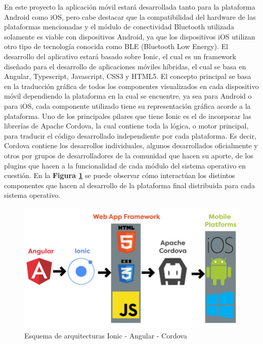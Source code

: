 \documentclass{IEEEtran}
\begin{document}
			En este proyecto la aplicación móvil estará desarrollada tanto para la plataforma Android como iOS, pero cabe destacar que la compatibilidad del hardware de las plataformas mencionadas y el módulo de conectividad Bluetooth utilizada solamente es viable con dispositivos Android, ya que los dispositivos iOS utilizan otro tipo de tecnología conocida como BLE (Bluetooth Low Energy).
			El desarrollo del aplicativo estará basado sobre Ionic, el cual es un framework diseñado para el desarrollo de aplicaciones móviles híbridas, el cual se basa en Angular, Typescript, Javascript, CSS3 y HTML5. El concepto principal se basa en la traducción gráfica de todos los componentes visualizados en cada dispositivo móvil dependiendo la plataforma en la cual se encuentre, ya sea para Android o para iOS, cada componente utilizado tiene su representación gráfica acorde a la plataforma.
			Uno de los principales pilares que tiene Ionic es el de incorporar las librerías de Apache Cordova, la cual contiene toda la lógica, o motor principal, para traducir el código desarrollado independiente por cada plataforma. Es decir, Cordova contiene los desarrollos individuales, algunos desarrollados oficialmente y otros por grupos de desarrolladores de la comunidad que hacen su aporte, de los plugins que hacen a la funcionalidad de cada módulo del sistema operativo en cuestión. En la \textbf{Figura \ref{ionic-angular-cordova}} se puede observar cómo interactúan los distintos componentes que hacen al desarrollo de la plataforma final distribuida para cada sistema operativo.

			\begin{figure}
				\centering
				\includegraphics[width=1\linewidth]{ionic-angular-cordova}
				\caption{Esquema de arquitecturas Ionic - Angular - Cordova}
				\label{ionic-angular-cordova}
			\end{figure}
\end{document}
